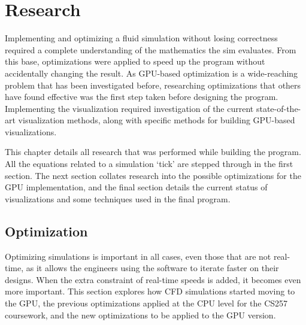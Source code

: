 
\chapter{Research}
\label{sec:Research} 

Implementing and optimizing a fluid simulation without losing correctness required a complete understanding of the mathematics the sim evaluates.
From this base, optimizations were applied to speed up the program without accidentally changing the result.
As GPU-based optimization is a wide-reaching problem that has been investigated before, researching optimizations that others have found effective was the first step taken before designing the program.
Implementing the visualization required investigation of the current state-of-the-art visualization methods, along with specific methods for building GPU-based visualizations.

This chapter details all research that was performed while building the program.
All the equations related to a simulation `tick' are stepped through in the first section.
The next section collates research into the possible optimizations for the GPU implementation, and the final section details the current status of visualizations and some techniques used in the final program.



\section{Optimization}
\label{sec:Research:Optimization}
Optimizing simulations is important in all cases, even those that are not real-time, as it allows the engineers using the software to iterate faster on their designs.
When the extra constraint of real-time speeds is added, it becomes even more important.
This section explores how CFD simulations started moving to the GPU, the previous optimizations applied at the CPU level for the CS257 coursework, and the new optimizations to be applied to the GPU version.

